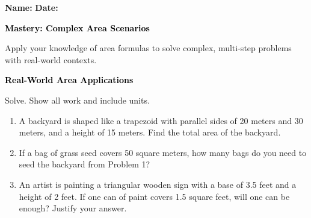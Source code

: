 \documentclass[12pt, letterpaper, fleqn]{article}
\begin{document}
\textbf{Name:} \underline{\hspace{5cm}}
\hfill
\textbf{Date:} \underline{\hspace{3cm}}\\

\begin{tcolorbox}[colback=black!10]
    \large\textcolor{black}{\textbf{Mastery: Complex Area Scenarios}}
\end{tcolorbox}

\vspace{3mm}

\noindent
Apply your knowledge of area formulas to solve complex, multi-step problems with real-world contexts.

\vspace{4mm}

\begin{tcolorbox}[colback=black!10]
\large\textcolor{black}{\textbf{Real-World Area Applications}}
\end{tcolorbox}

\noindent
Solve. Show all work and include units.

\vspace{3mm}

\begin{enumerate}[itemsep=2.2cm, leftmargin=0.6cm]

\item A backyard is shaped like a trapezoid with parallel sides of 20 meters and 30 meters, and a height of 15 meters. Find the total area of the backyard.

\vspace{2cm}

\item If a bag of grass seed covers 50 square meters, how many bags do you need to seed the backyard from Problem 1?

\vspace{2cm}

\item An artist is painting a triangular wooden sign with a base of 3.5 feet and a height of 2 feet. If one can of paint covers 1.5 square feet, will one can be enough? Justify your answer.

\vspace{2cm}

\end{enumerate}
\end{document}
